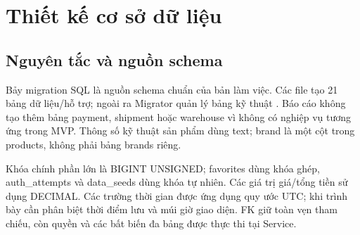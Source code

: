 \section{Thiết kế cơ sở dữ liệu}
\label{sec:database}
\subsection{Nguyên tắc và nguồn schema}
Bảy migration SQL là nguồn schema chuẩn của bản làm việc. Các file tạo 21 bảng dữ liệu/hỗ trợ; ngoài ra Migrator quản lý bảng kỹ thuật . Báo cáo không tạo thêm bảng payment, shipment hoặc warehouse vì không có nghiệp vụ tương ứng trong MVP. Thông số kỹ thuật sản phẩm dùng text; brand là một cột trong products, không phải bảng brands riêng.\cite{repository}

Khóa chính phần lớn là BIGINT UNSIGNED; favorites dùng khóa ghép, auth\_attempts và data\_seeds dùng khóa tự nhiên. Các giá trị giá/tổng tiền sử dụng DECIMAL. Các trường thời gian được ứng dụng quy ước UTC; khi trình bày cần phân biệt thời điểm lưu và múi giờ giao diện. FK giữ toàn vẹn tham chiếu, còn quyền và các bất biến đa bảng được thực thi tại Service.

